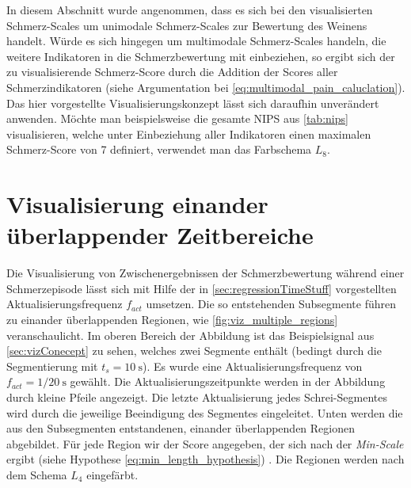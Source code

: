 In diesem Abschnitt wurde angenommen, dass es sich bei den visualisierten Schmerz-Scales um unimodale Schmerz-Scales zur Bewertung des Weinens handelt. Würde es sich hingegen um multimodale Schmerz-Scales handeln, die weitere Indikatoren in die Schmerzbewertung mit einbeziehen, so ergibt sich der zu visualisierende Schmerz-Score durch die Addition der Scores aller Schmerzindikatoren (siehe Argumentation bei  \autoref{eq:multimodal_pain_caluclation}). Das hier vorgestellte Visualisierungskonzept lässt sich daraufhin unverändert anwenden. Möchte man beispielsweise die gesamte NIPS aus \autoref{tab:nips} visualisieren, welche unter Einbeziehung aller Indikatoren einen maximalen Schmerz-Score von 7 definiert, verwendet man das Farbschema $L_8$.

 
\section{Visualisierung einander überlappender Zeitbereiche}
\label{sec:vizWithOverlap}
 
Die Visualisierung von \glqq Zwischenergebnissen\grqq{} der Schmerzbewertung während einer Schmerzepisode lässt sich mit Hilfe der in \autoref{sec:regressionTimeStuff} vorgestellten Aktualisierungsfrequenz $f_{act}$ umsetzen. Die so entstehenden Subsegmente führen zu einander überlappenden Regionen, wie \autoref{fig:viz_multiple_regions} veranschaulicht. Im oberen Bereich der Abbildung ist das Beispielsignal aus \autoref{sec:vizConecept} zu sehen, welches zwei Segmente enthält (bedingt durch die Segmentierung mit $t_s = \SI{10}{\second}$). Es wurde eine Aktualisierungsfrequenz von  $f_{act} = 1/ \SI{20}{\second}$ gewählt. Die Aktualisierungszeitpunkte werden in der Abbildung durch kleine Pfeile angezeigt. Die letzte Aktualisierung jedes Schrei-Segmentes wird durch die jeweilige Beeindigung des Segmentes eingeleitet. Unten werden die aus den Subsegmenten entstandenen, einander überlappenden Regionen abgebildet. Für jede Region wir der Score angegeben, der sich nach der \emph{Min-Scale} ergibt (siehe Hypothese \autoref{eq:min_length_hypothesis}) . Die Regionen werden nach dem Schema $L_4$ eingefärbt.

